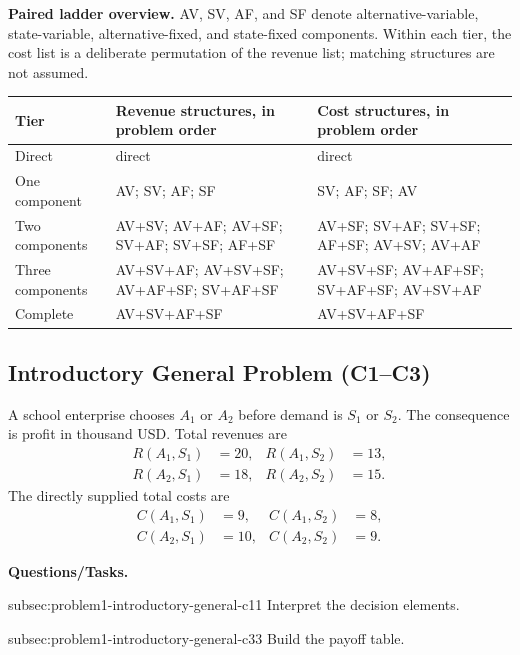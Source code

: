 \textbf{Paired ladder overview.} AV, SV, AF, and SF denote
alternative-variable, state-variable, alternative-fixed, and state-fixed
components. Within each tier, the cost list is a deliberate permutation of the
revenue list; matching structures are not assumed.

\begin{center}
	\small
	\begin{tabularx}{\textwidth}{@{}lXX@{}}
		\toprule
		Tier
		& Revenue structures, in problem order
		& Cost structures, in problem order \\
		\midrule
		Direct
		& direct
		& direct \\
		
		One component
		& AV; SV; AF; SF
		& SV; AF; SF; AV \\
		
		Two components
		& AV+SV; AV+AF; AV+SF; SV+AF; SV+SF; AF+SF
		& AV+SF; SV+AF; SV+SF; AF+SF; AV+SV; AV+AF \\
		
		Three components
		& AV+SV+AF; AV+SV+SF; AV+AF+SF; SV+AF+SF
		& AV+SV+SF; AV+AF+SF; SV+AF+SF; AV+SV+AF \\
		
		Complete
		& AV+SV+AF+SF
		& AV+SV+AF+SF \\
		\bottomrule
	\end{tabularx}
\end{center}

\subsection{Introductory General Problem (C1--C3)}
\label{sec:problem1-introductory-general-c1-c3}

A school enterprise chooses \(A_1\) or \(A_2\) before demand is \(S_1\) or
\(S_2\). The consequence is profit in thousand USD. Total revenues are
\[
\begin{aligned}
	R(A_1,S_1)&=20,
	&
	R(A_1,S_2)&=13,
	\\
	R(A_2,S_1)&=18,
	&
	R(A_2,S_2)&=15.
\end{aligned}
\]
The directly supplied total costs are
\[
\begin{aligned}
	C(A_1,S_1)&=9,
	&
	C(A_1,S_2)&=8,
	\\
	C(A_2,S_1)&=10,
	&
	C(A_2,S_2)&=9.
\end{aligned}
\]

\textbf{Questions/Tasks.}
\begin{enumerate}
	\CriterionTask
	{subsec:problem1-introductory-general-c1}{1}
	{Interpret the decision elements.}

	\CriterionTask
	{subsec:problem1-introductory-general-c3}{3}
	{Build the payoff table.}
\end{enumerate}

